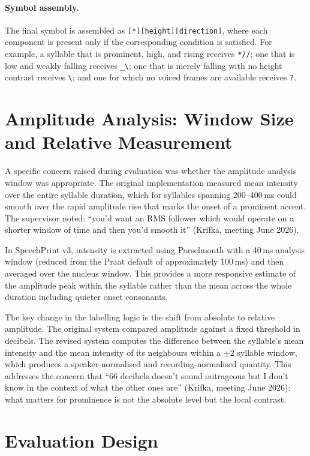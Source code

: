 \paragraph{Symbol assembly.}
The final symbol is assembled as \texttt{[*][height][direction]}, where each
component is present only if the corresponding condition is satisfied. For
example, a syllable that is prominent, high, and rising receives
\texttt{*{\={}}//}; one that is low and weakly falling receives
\texttt{\_\textbackslash}; one that is merely falling with no height contrast
receives \texttt{\textbackslash}; and one for which no voiced frames are
available receives \texttt{?}.

\section{Amplitude Analysis: Window Size and Relative Measurement}
\label{sec:amplitude}

A specific concern raised during evaluation was whether the amplitude analysis
window was appropriate. The original implementation measured mean intensity over
the entire syllable duration, which for syllables spanning 200--400\,ms could
smooth over the rapid amplitude rise that marks the onset of a prominent accent.
The supervisor noted: ``you'd want an RMS follower which would operate on a
shorter window of time and then you'd smooth it'' (Krifka, meeting June 2026).

In SpeechPrint v3, intensity is extracted using Parselmouth with a 40\,ms
analysis window (reduced from the Praat default of approximately 100\,ms) and
then averaged over the nucleus window. This provides a more responsive estimate
of the amplitude peak within the syllable rather than the mean across the whole
duration including quieter onset consonants.

The key change in the labelling logic is the shift from absolute to relative
amplitude. The original system compared amplitude against a fixed threshold in
decibels. The revised system computes the difference between the syllable's mean
intensity and the mean intensity of its neighbours within a $\pm 2$ syllable
window, which produces a speaker-normalised and recording-normalised quantity.
This addresses the concern that ``66 decibels doesn't sound outrageous but I
don't know in the context of what the other ones are'' (Krifka, meeting June 2026):
what matters for prominence is not the absolute level but the local contrast.

\section{Evaluation Design}
\label{sec:eval_design}

